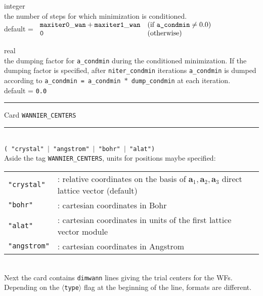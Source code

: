 {\noindent{}%
{\sc integer} \\ the number of steps for which minimization is conditioned.\\
{\sc default} = $\begin{array}{ll}
           {\tt maxiter0\_wan + maxiter1\_wan}     & \textrm{(if {\tt a\_condmin}} \neq 0.0)\\
           {\tt 0}                                 & \textrm{(otherwise)}
           \end{array}$ \par

\noindent{}%
{\sc real} \\ the dumping factor for {\tt a\_condmin} during the conditioned minimization.
              If the dumping factor is specified, after {\tt niter\_condmin}
              iterations {\tt a\_condmin}
              is dumped according to {\tt a\_condmin = a\_condmin $*$ dump\_condmin}
              at each iteration.\\
{\sc default} = {\tt 0.0} \par
}
\bigskip

\begin{centering}
\rule{2.0in}{0.01in} Card {\tt WANNIER\_CENTERS} \rule{2.0in}{0.01in}
\end{centering}\\

{\tt ( "crystal" $\mid$ "angstrom" $\mid$ "bohr" $\mid$ "alat") }\\

\noindent Aside the tag {\tt WANNIER\_CENTERS}, units for positions maybe specified:\\
%
%
\begin{tabular}{ll}
\texttt{"crystal"}  & : relative coordinates on the basis of $\mathbf{a}_1,\mathbf{a}_2,\mathbf{a}_3$
                                direct lattice vector (default)\\
\texttt{"bohr"}     & : cartesian coordinates in Bohr\\
\texttt{"alat"}     & : cartesian coordinates in units of the
                        first lattice vector module\\
\texttt{"angstrom"} & : cartesian coordinates in Angstrom
\end{tabular}
%
%
\\

\noindent Next the card contains {\tt dimwann} lines giving the trial centers for the WFs.
Depending on the $\langle${\tt type}$\rangle$ flag at the beginning of the line,
formats are different.\\

